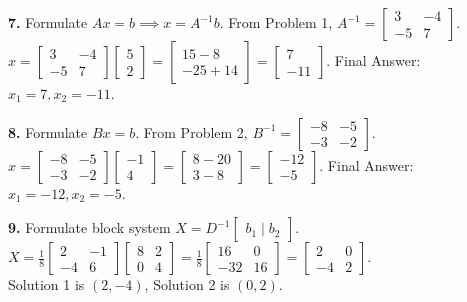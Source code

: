 \documentclass{article}
\begin{document}
\vspace{5pt}
\noindent
\textbf{7.} Formulate $Ax = b \implies x = A^{-1}b$. From Problem 1, $A^{-1} = \begin{bmatrix} 3 & -4 \\ -5 & 7 \end{bmatrix}$. \\
$x = \begin{bmatrix} 3 & -4 \\ -5 & 7 \end{bmatrix} \begin{bmatrix} 5 \\ 2 \end{bmatrix} = \begin{bmatrix} 15 - 8 \\ -25 + 14 \end{bmatrix} = \begin{bmatrix} 7 \\ -11 \end{bmatrix}$. Final Answer: $x_1 = 7, x_2 = -11$.

\vspace{5pt}
\noindent
\textbf{8.} Formulate $Bx = b$. From Problem 2, $B^{-1} = \begin{bmatrix} -8 & -5 \\ -3 & -2 \end{bmatrix}$. \\
$x = \begin{bmatrix} -8 & -5 \\ -3 & -2 \end{bmatrix} \begin{bmatrix} -1 \\ 4 \end{bmatrix} = \begin{bmatrix} 8 - 20 \\ 3 - 8 \end{bmatrix} = \begin{bmatrix} -12 \\ -5 \end{bmatrix}$. Final Answer: $x_1 = -12, x_2 = -5$.

\vspace{5pt}
\noindent
\textbf{9.} Formulate block system $X = D^{-1} \begin{bmatrix} b_1 \mid b_2 \end{bmatrix}$. \\
$X = \frac{1}{8} \begin{bmatrix} 2 & -1 \\ -4 & 6 \end{bmatrix} \begin{bmatrix} 8 & 2 \\ 0 & 4 \end{bmatrix} = \frac{1}{8} \begin{bmatrix} 16 & 0 \\ -32 & 16 \end{bmatrix} = \begin{bmatrix} 2 & 0 \\ -4 & 2 \end{bmatrix}$. \\
Solution 1 is $(2, -4)$, Solution 2 is $(0, 2)$.
\end{document}

